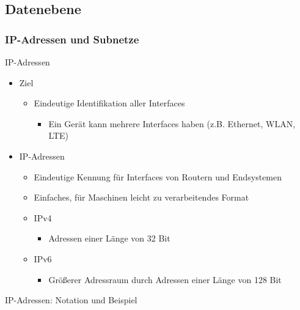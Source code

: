   \subsection{Datenebene}
    \subsubsection{IP-Adressen und Subnetze}
      IP-Adressen
      \begin{itemize}
        \item Ziel
          \begin{itemize}
            \item Eindeutige Identifikation aller Interfaces
              \begin{itemize}
                \item Ein Gerät kann mehrere Interfaces haben (z.B. Ethernet, WLAN, LTE)
              \end{itemize}
          \end{itemize}
        \item IP-Adressen
          \begin{itemize}
            \item Eindeutige Kennung für Interfaces von Routern und Endsystemen
            \item Einfaches, für Maschinen leicht zu verarbeitendes Format
            \item IPv4
              \begin{itemize}
                \item Adressen einer Länge von 32 Bit
              \end{itemize}
            \item IPv6
              \begin{itemize}
                \item Größerer Adressraum durch Adressen einer Länge von 128 Bit
              \end{itemize}
          \end{itemize}
      \end{itemize}
      IP-Adressen: Notation und Beispiel
